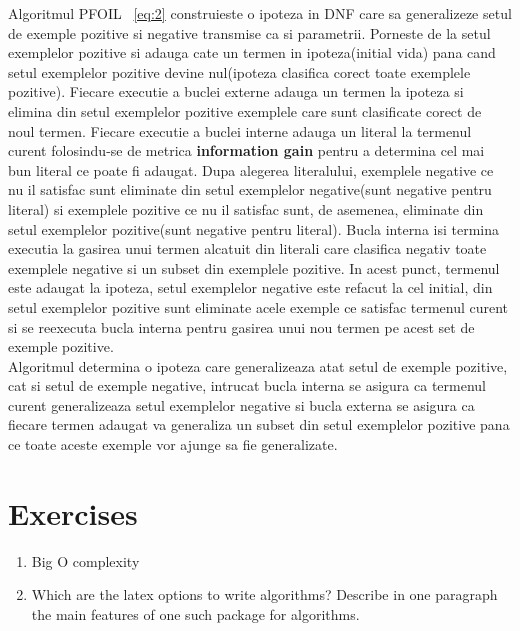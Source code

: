 \documentclass[a4paper,12pt]{report}
\begin{document}
	Algoritmul PFOIL ~\ref{eq:2} construieste o ipoteza in DNF care sa generalizeze setul de exemple pozitive si negative transmise ca si parametrii. Porneste de la setul exemplelor pozitive si adauga cate un termen in ipoteza(initial vida) pana cand setul exemplelor pozitive devine nul(ipoteza clasifica corect toate exemplele pozitive). Fiecare executie a buclei externe adauga un termen la ipoteza si elimina din setul exemplelor pozitive exemplele care sunt clasificate corect de noul termen. Fiecare executie a buclei interne adauga un literal la termenul curent folosindu-se de metrica \textbf{information gain} pentru a determina cel mai bun literal ce poate fi adaugat. Dupa alegerea literalului, exemplele negative ce nu il satisfac sunt eliminate din setul exemplelor negative(sunt negative pentru literal) si exemplele pozitive ce nu il satisfac sunt, de asemenea, eliminate din setul exemplelor pozitive(sunt negative pentru literal). Bucla interna isi termina executia la gasirea unui termen alcatuit din literali care clasifica negativ toate exemplele negative si un subset din exemplele pozitive. In acest punct, termenul este adaugat la ipoteza, setul exemplelor negative este refacut la cel initial, din setul exemplelor pozitive sunt eliminate acele exemple ce satisfac termenul curent si se reexecuta bucla interna pentru gasirea unui nou termen pe acest set de exemple pozitive.\\
	Algoritmul determina o ipoteza care generalizeaza atat setul de exemple pozitive, cat si setul de exemple negative, intrucat bucla interna se asigura ca termenul curent generalizeaza setul exemplelor negative si bucla externa se asigura ca fiecare termen adaugat va generaliza un subset din setul exemplelor pozitive pana ce toate aceste exemple vor ajunge sa fie generalizate.

\section{Exercises}
\begin{enumerate}
 \item Big O complexity
 \item Which are the latex options to write algorithms? 
 Describe in one paragraph the main features of one such package for algorithms.
\end{enumerate}

\vspace{0.5cm}
\end{document}
